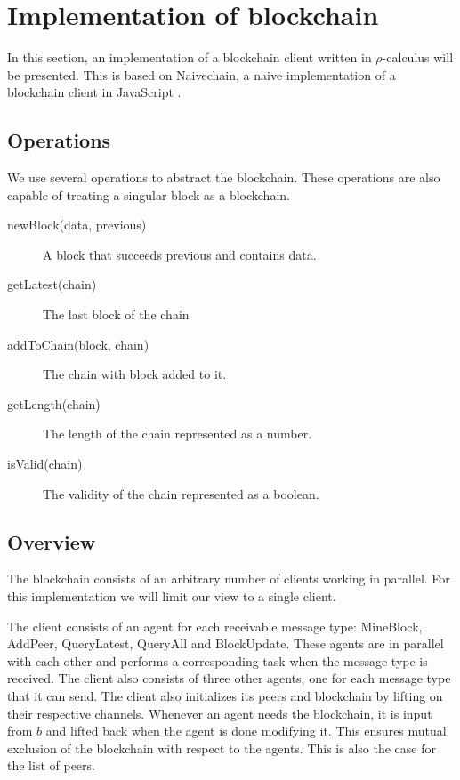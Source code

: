 \section{Implementation of blockchain}
In this section, an implementation of a blockchain client written in $\rho$-calculus will be presented.
This is based on Naivechain, a naive implementation of a blockchain client in JavaScript \cite{naivechain}.


\subsection{Operations}

We use several operations to abstract the blockchain. These operations are also capable of treating a singular block as a blockchain.

\begin{description}
	\item[newBlock(data, previous)]
	A block that succeeds previous and contains data.
	\item[getLatest(chain)]
	The last block of the chain
	\item[addToChain(block, chain)]
	The chain with block added to it.
	\item[getLength(chain)]
	The length of the chain represented as a number.
	\item[isValid(chain)]
	The validity of the chain represented as a boolean.
\end{description}

%

\subsection{Overview}

The blockchain consists of an arbitrary number of clients working in parallel. For this implementation we will limit our view to a single client.

The client consists of an agent for each receivable message type: MineBlock, AddPeer, QueryLatest, QueryAll and BlockUpdate.
These agents are in parallel with each other and performs a corresponding task when the message type is received.
The client also consists of three other agents, one for each message type that it can send.
The client also initializes its peers and blockchain by lifting on their respective channels.
Whenever an agent needs the blockchain, it is input from $b$ and lifted back when the agent is done modifying it.
This ensures mutual exclusion of the blockchain with respect to the agents.
This is also the case for the list of peers.

